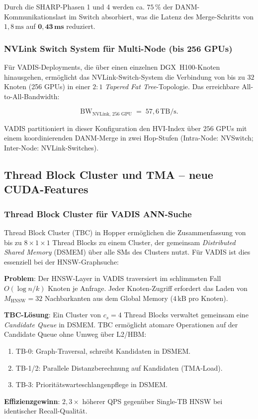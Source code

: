 ﻿\documentclass[12pt,a4paper]{article}
\begin{document}
\noindent Durch die SHARP-Phasen 1 und 4 werden
ca. $75\,\%$ der DANM-Kommunikationslast im Switch absorbiert,
was die Latenz des Merge-Schritts von $1{,}8\,\text{ms}$
auf $\mathbf{0{,}43\,\text{ms}}$ reduziert.

\subsubsection{NVLink Switch System für Multi-Node (bis 256 GPUs)}

Für VADIS-Deployments, die über einen einzelnen DGX~H100-Knoten
hinausgehen, ermöglicht das NVLink-Switch-System die Verbindung
von bis zu $32$ Knoten (256 GPUs) in einer $2{:}1$
\emph{Tapered Fat Tree}-Topologie.
Das erreichbare All-to-All-Bandwidth:

\begin{equation}
  \text{BW}_{\text{NVLink, 256 GPU}} \;=\; 57{,}6\,\text{TB/s}.
\end{equation}

VADIS partitioniert in dieser Konfiguration den HVI-Index über
$256$ GPUs mit einem koordinierenden DANM-Merge in
zwei Hop-Stufen (Intra-Node: NVSwitch; Inter-Node: NVLink-Switches).

\subsection{Thread Block Cluster und TMA -- neue CUDA-Features}
\label{sub:cluster_tma}

\subsubsection{Thread Block Cluster für VADIS ANN-Suche}

Thread Block Cluster (TBC) in Hopper ermöglichen die
Zusammenfassung von bis zu $8 \times 1 \times 1$ Thread Blocks
zu einem Cluster, der gemeinsam \emph{Distributed Shared Memory}
(DSMEM) über alle SMs des Clusters nutzt.
Für VADIS ist dies essenziell bei der HNSW-Graphsuche:

\begin{tcolorbox}[mybox, title={TBC-optimierter HNSW-Scan}]
\small
\textbf{Problem}: Der HNSW-Layer in VADIS traversiert im schlimmsten
Fall $O(\log n/k)$ Knoten je Anfrage. Jeder Knoten-Zugriff
erfordert das Laden von $M_{\text{HNSW}} = 32$ Nachbarkanten
aus dem Global Memory ($4\,\text{kB}$ pro Knoten).

\textbf{TBC-Lösung}: Ein Cluster von $c_s = 4$ Thread Blocks
verwaltet gemeinsam eine \emph{Candidate Queue} in DSMEM.
TBC ermöglicht atomare Operationen auf der Candidate Queue
ohne Umweg über L2/HBM:
\begin{enumerate}[leftmargin=1.2em, itemsep=0pt, topsep=2pt]
  \item TB-0: Graph-Traversal, schreibt Kandidaten in DSMEM.
  \item TB-1/2: Parallele Distanzberechnung auf Kandidaten (TMA-Load).
  \item TB-3: Prioritätswarteschlangenpflege in DSMEM.
\end{enumerate}
\textbf{Effizienzgewinn}: $2{,}3\times$ höherer QPS gegenüber
Single-TB HNSW bei identischer Recall-Qualität.
\end{tcolorbox}
\end{document}
